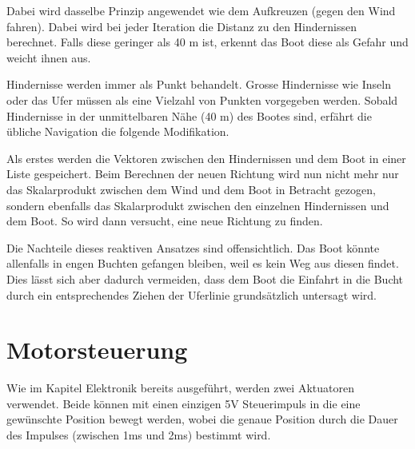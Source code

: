 Dabei wird dasselbe Prinzip angewendet wie dem Aufkreuzen (gegen den Wind fahren). Dabei wird bei jeder Iteration die Distanz zu den Hindernissen berechnet. Falls diese geringer als 40 m ist, erkennt das Boot diese als Gefahr und weicht ihnen aus.  

Hindernisse werden immer als Punkt behandelt. Grosse Hindernisse wie Inseln oder das Ufer müssen als eine Vielzahl von Punkten vorgegeben werden. Sobald Hindernisse in der unmittelbaren Nähe (40 m) des Bootes sind, erfährt die übliche Navigation die folgende Modifikation.

Als erstes werden die Vektoren zwischen den Hindernissen und dem Boot in einer Liste gespeichert. Beim Berechnen der neuen Richtung wird nun nicht mehr nur das Skalarprodukt zwischen dem Wind und dem Boot in Betracht gezogen, sondern ebenfalls das Skalarprodukt zwischen den einzelnen Hindernissen und dem Boot. So wird dann versucht,  eine neue Richtung zu finden.

Die Nachteile dieses reaktiven Ansatzes sind offensichtlich. Das Boot könnte allenfalls in engen Buchten gefangen bleiben, weil es kein Weg aus diesen findet. Dies lässt sich aber dadurch vermeiden, dass dem Boot die Einfahrt in die Bucht durch ein entsprechendes Ziehen der Uferlinie grundsätzlich untersagt wird. 
\section{Motorsteuerung}
Wie im Kapitel Elektronik bereits ausgeführt, werden zwei Aktuatoren verwendet. Beide können mit einen einzigen 5V Steuerimpuls in die eine gewünschte Position bewegt werden, wobei die genaue Position durch die Dauer des Impulses (zwischen 1ms und 2ms) bestimmt wird. 
